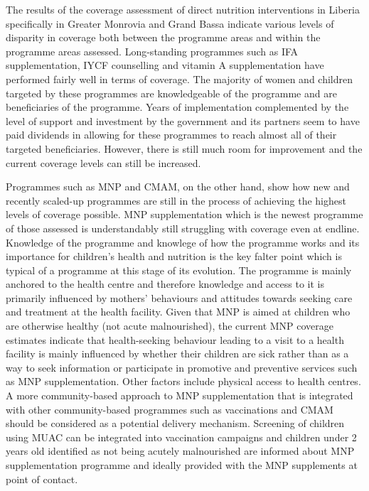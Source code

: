 \documentclass[12pt,a4paper]{article}
\begin{document}
The results of the coverage assessment of direct nutrition interventions in Liberia specifically in Greater Monrovia and Grand Bassa indicate various levels of disparity in coverage both between the programme areas and within the programme areas assessed. Long-standing programmes such as IFA supplementation, IYCF counselling and vitamin A supplementation have performed fairly well in terms of coverage. The majority of women and children targeted by these programmes are knowledgeable of the programme and are beneficiaries of the programme. Years of implementation complemented by the level of support and investment by the government and its partners seem to have paid dividends in allowing for these programmes to reach almost all of their targeted beneficiaries. However, there is still much room for improvement and the current coverage levels can still be increased.

Programmes such as MNP and CMAM, on the other hand, show how new and recently scaled-up programmes are still in the process of achieving the highest levels of coverage possible. MNP supplementation which is the newest programme of those assessed is understandably still struggling with coverage even at endline. Knowledge of the programme and knowlege of how the programme works and its importance for children's health and nutrition is the key falter point which is typical of a programme at this stage of its evolution. The programme is mainly anchored to the health centre and therefore knowledge and access to it is primarily influenced by mothers' behaviours and attitudes towards seeking care and treatment at the health facility. Given that MNP is aimed at children who are otherwise healthy (not acute malnourished), the current MNP coverage estimates indicate that health-seeking behaviour leading to a visit to a health facility is mainly influenced by whether their children are sick rather than as a way to seek information or participate in promotive and preventive services such as MNP supplementation. Other factors include physical access to health centres. A more community-based approach to MNP supplementation that is integrated with other community-based programmes such as vaccinations and CMAM should be considered as a potential delivery mechanism. Screening of children using MUAC can be integrated into vaccination campaigns and children under 2 years old identified as not being acutely malnourished are informed about MNP supplementation programme and ideally provided with the MNP supplements at point of contact.
\end{document}
